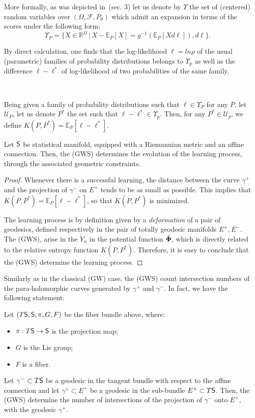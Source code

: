 More formally, as was depicted in\, \cite{BCN99} (sec. 3) let us denote by $\Upsilon$ the set of (centered) random variables over $(\Omega,\mathcal{F},P_{\theta})$
which admit an expansion in terms of the scores under the following form:
\[\Upsilon_P= \{X\in \mathbb{R}^{\Omega}\, |\, X-\mathbb{E}_P[X]=g^{-1}(\mathbb{E}_P[Xd\ell]), d\ell \}. \]


By direct calculation, one finds that the log-likelihood $\ell= ln\rho$ of the usual (parametric) families of probability distributions belongs to 
$\Upsilon_p$  as well as the difference $\ell -\ell^*$  of log-likelihood of two probabilities of the same family. 

\, 

Being given a family of probability distributions such that $\ell \in  \Upsilon_P$ for any $P$, let $\mathcal{U}_P$, let us denote $P^*$ the set
 such that $\ell-\ell^*\in  \Upsilon_p$. Then, for any $P^*\in  \mathcal{U}_p$, we define $K(P,P^*)=\mathbb{E}_P[\ell - \ell^*]$. 

\begin{theorem}
Let $\mathsf{S}$ be  statistical manifold, equipped with a Riemannian metric and an affine connection. Then, the (GWS) determines the evolution of the learning process, through the associated geometric constraints. 
\end{theorem}
\begin{proof}
Whenever there is a successful learning, the distance between the curve $\gamma^+$ and the projection of  $\gamma^-$ on $E^+$ tends to be as small as possible. This implies that $K(P,P^*)=\mathbb{E}_P[\ell - \ell^*]$, so that $K(P,P^*)$ is minimized.

The learning process is by definition given by a {\it deformation} of a pair of geodesics, defined respectively in the pair of totally geodesic manifolds $E^+, E^-$. The (GWS), arise in the $\tilde{Y}_n$ in the potential function $\tilde{\bf \Phi}$, which is directly related to the relative entropy function $K(P,P^*)$. Therefore, it is easy to conclude that the (GWS) determine the learning process.
 \end{proof}

Similarly as in the classical (GW) case, the (GWS) count intersection numbers of the para-holomorphic curves generated by $\gamma^+$ and $\gamma^-$. In fact, we have the following statement:
\begin{corollary}
Let $(T\mathsf{S},\mathsf{S},\pi,G,F)$ be the fiber bundle above, where: 
\begin{itemize}
    \item $\pi:T\mathsf{S}\to \mathsf{S}$ is the projection map;
    \item $G$ is the Lie group;
    \item $F$ is a fiber.
\end{itemize}
Let $\gamma^-\subset T\mathsf{S}$ be a geodesic in the tangent bundle with respect to the affine connection and let $\gamma^+\subset E^+$ be a geodesic in the sub-bundle $E^+\subset T\mathsf{S}$. Then, the (GWS) determine the number of intersections of the projection of  $\gamma^-$ onto $E^+$, with the geodesic $\gamma^+$.
\end{corollary}


